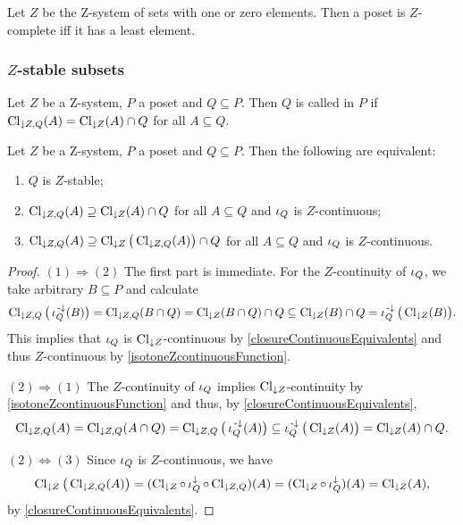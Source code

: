 Let $Z$ be the $\mathrm{Z}$-system of sets with one or zero elements. Then a poset is $Z$-complete iff it has a least element.


\subsubsection{$Z$-stable subsets}
\begin{definition}
Let $Z$ be a $\mathrm{Z}$-system, $P$ a poset and $Q\subseteq P$. Then $Q$ is called  in $P$ if $\operatorname{Cl}_{\downarrow Z, Q}(A) = \operatorname{Cl}_{\downarrow Z}(A) \cap Q$ for all $A\subseteq Q$.
\end{definition}

\begin{lemma} \label{ZstableLemma}
Let $Z$ be a $\mathrm{Z}$-system, $P$ a poset and $Q\subseteq P$. Then the following are equivalent:
\begin{enumerate}
\item $Q$ is $Z$-stable;
\item $\operatorname{Cl}_{\downarrow Z, Q}(A) \supseteq \operatorname{Cl}_{\downarrow Z}(A) \cap Q$ for all $A\subseteq Q$ and $\operatorname{\iota}_Q$ is $Z$-continuous;
\item $\operatorname{Cl}_{\downarrow Z, Q}(A) \supseteq \operatorname{Cl}_{\downarrow Z}\big(\operatorname{Cl}_{\downarrow Z, Q}(A)\big) \cap Q$ for all $A\subseteq Q$ and $\operatorname{\iota}_Q$ is $Z$-continuous.
\end{enumerate}
\end{lemma}
\begin{proof}
$(1) \Rightarrow (2)$ The first part is immediate. For the $Z$-continuity of $\operatorname{\iota}_Q$, we take arbitrary $B\subseteq P$ and calculate
\[ \operatorname{Cl}_{\downarrow Z, Q}\big(\operatorname{\iota}_Q^{\text{\hspace{0.15em}-}\downarrow}(B)\big) = \operatorname{Cl}_{\downarrow Z, Q}(B\cap Q) = \operatorname{Cl}_{\downarrow Z}(B\cap Q) \cap Q \subseteq \operatorname{Cl}_{\downarrow Z}(B) \cap Q = \operatorname{\iota}_Q^{\text{\hspace{0.15em}-}\downarrow}\big(\operatorname{Cl}_{\downarrow Z}(B)\big). \]
This implies that $\operatorname{\iota}_Q$ is $\operatorname{Cl}_{\downarrow Z}$-continuous by \ref{closureContinuousEquivalents} and thus $Z$-continuous by \ref{isotoneZcontinuousFunction}.

$(2) \Rightarrow (1)$ The $Z$-continuity of $\operatorname{\iota}_Q$ implies $\operatorname{Cl}_{\downarrow Z}$-continuity by \ref{isotoneZcontinuousFunction} and thus, by \ref{closureContinuousEquivalents},
\[ \operatorname{Cl}_{\downarrow Z, Q}(A) = \operatorname{Cl}_{\downarrow Z, Q}(A\cap Q) = \operatorname{Cl}_{\downarrow Z, Q}\big(\operatorname{\iota}_Q^{\text{\hspace{0.15em}-}\downarrow}(A)\big) \subseteq \operatorname{\iota}_Q^{\text{\hspace{0.15em}-}\downarrow}\big(\operatorname{Cl}_{\downarrow Z}(A)\big) = \operatorname{Cl}_{\downarrow Z}(A) \cap Q. \]

$(2) \Leftrightarrow (3)$ Since $\operatorname{\iota}_Q$ is $Z$-continuous, we have
\[ \operatorname{Cl}_{\downarrow Z}\big(\operatorname{Cl}_{\downarrow Z, Q}(A)\big) = (\operatorname{Cl}_{\downarrow Z}\circ \operatorname{\iota}_Q^\downarrow \circ \operatorname{Cl}_{\downarrow Z, Q})(A) = (\operatorname{Cl}_{\downarrow Z}\circ \operatorname{\iota}_Q^\downarrow)(A) = \operatorname{Cl}_{\downarrow Z}(A), \]
by \ref{closureContinuousEquivalents}.
\end{proof}

